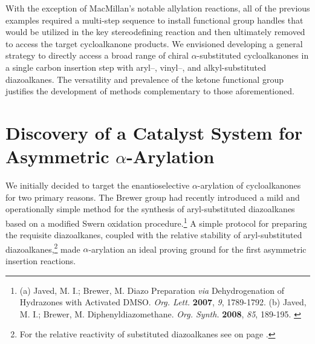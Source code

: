 With the exception of MacMillan's notable allylation reactions, all of
 the previous examples required a multi-step sequence to install functional group handles that would
 be utilized in the key stereodefining reaction and then ultimately removed to access the target
 cycloalkanone products. We envisioned developing a general strategy to directly access a broad
 range of chiral $\alpha$-substituted cycloalkanones in a single carbon insertion step with aryl--,
 vinyl--, and alkyl-substituted diazoalkanes.
 The versatility and prevalence of the ketone functional group justifies the development of
 methods complementary to those aforementioned.  
 
 \pagebreak
 \section{Discovery of a Catalyst System for Asymmetric $\alpha$-Arylation}
 
 We initially decided to target the enantioselective $\alpha$-arylation of cycloalkanones for two
 primary reasons.
 The Brewer group had recently introduced a mild and operationally simple method for the synthesis of
 aryl-substituted diazoalkanes based on a modified Swern oxidation procedure.\footnote{(a)
 {\frenchspacing Javed, M. I.; Brewer, M. Diazo Preparation \textit{via} Dehydrogenation of
 Hydrazones with Activated DMSO. \textit{Org. Lett.} \textbf{2007}, \textit{9}, 1789-1792.} (b)
 {\frenchspacing Javed, M. I.; Brewer, M. Diphenyldiazomethane. \textit{Org. Synth.} \textbf{2008},
 \textit{85}, 189-195.} \label{ref:asbrewer}}  A simple protocol for preparing the requisite
 diazoalkanes, coupled with the relative stability of aryl-substituted
 diazoalkanes,\footnote{For the relative reactivity of substituted diazoalkanes see  on page
 \pageref{fig:nucleophilicity}.} made $\alpha$-arylation an ideal proving ground for the first asymmetric insertion
 reactions.


